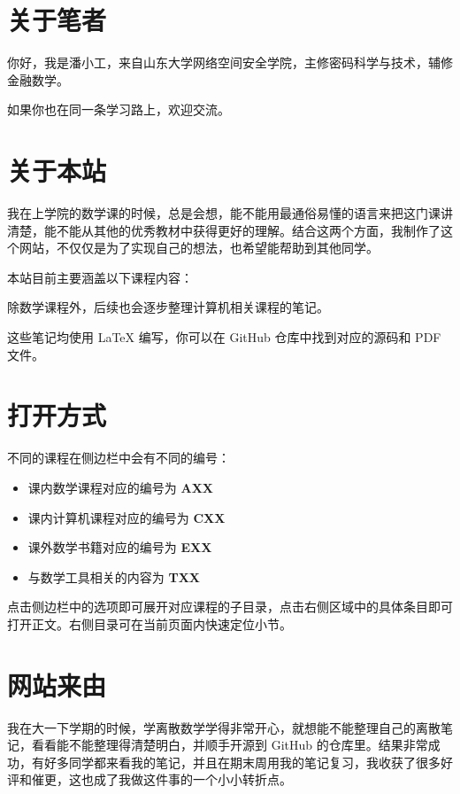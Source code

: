 
\section{关于笔者}

你好，我是潘小工，来自山东大学网络空间安全学院，主修密码科学与技术，辅修金融数学。

如果你也在同一条学习路上，欢迎交流。

\section{关于本站}

我在上学院的数学课的时候，总是会想，能不能用最通俗易懂的语言来把这门课讲清楚，能不能从其他的优秀教材中获得更好的理解。结合这两个方面，我制作了这个网站，不仅仅是为了实现自己的想法，也希望能帮助到其他同学。

本站目前主要涵盖以下课程内容：

除数学课程外，后续也会逐步整理计算机相关课程的笔记。

这些笔记均使用 LaTeX 编写，你可以在 GitHub 仓库中找到对应的源码和 PDF 文件。

\section{打开方式}

不同的课程在侧边栏中会有不同的编号：

\begin{itemize}
\item 课内数学课程对应的编号为 \textbf{AXX}
\item 课内计算机课程对应的编号为 \textbf{CXX}
\item 课外数学书籍对应的编号为 \textbf{EXX}
\item 与数学工具相关的内容为 \textbf{TXX}
\end{itemize}

点击侧边栏中的选项即可展开对应课程的子目录，点击右侧区域中的具体条目即可打开正文。右侧目录可在当前页面内快速定位小节。

\section{网站来由}

我在大一下学期的时候，学离散数学学得非常开心，就想能不能整理自己的离散笔记，看看能不能整理得清楚明白，并顺手开源到 GitHub 的仓库里。结果非常成功，有好多同学都来看我的笔记，并且在期末周用我的笔记复习，我收获了很多好评和催更，这也成了我做这件事的一个小小转折点。


